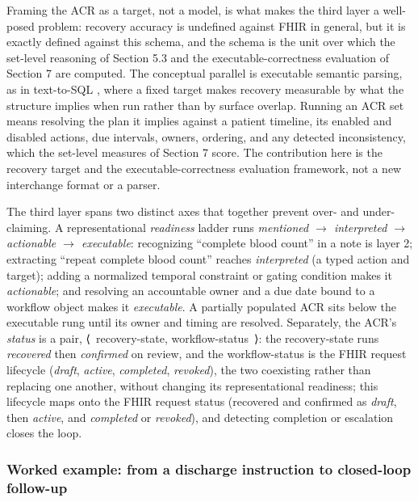 \documentclass[3p,twocolumn]{elsarticle}
\begin{document}
Framing the ACR as a target, not a model, is what makes the third layer a well-posed problem: recovery accuracy is undefined against FHIR in general, but it is exactly defined against this schema, and the schema is the unit over which the set-level reasoning of Section 5.3 and the executable-correctness evaluation of Section 7 are computed. The conceptual parallel is executable semantic parsing, as in text-to-SQL \cite{ref31}, where a fixed target makes recovery measurable by what the structure implies when run rather than by surface overlap. Running an ACR set means resolving the plan it implies against a patient timeline, its enabled and disabled actions, due intervals, owners, ordering, and any detected inconsistency, which the set-level measures of Section 7 score. The contribution here is the recovery target and the executable-correctness evaluation framework, not a new interchange format or a parser.

The third layer spans two distinct axes that together prevent over- and under-claiming. A representational \emph{readiness} ladder runs \emph{mentioned $\rightarrow$ interpreted $\rightarrow$ actionable $\rightarrow$ executable}: recognizing ``complete blood count'' in a note is layer 2; extracting ``repeat complete blood count'' reaches \emph{interpreted} (a typed action and target); adding a normalized temporal constraint or gating condition makes it \emph{actionable}; and resolving an accountable owner and a due date bound to a workflow object makes it \emph{executable}. A partially populated ACR sits below the executable rung until its owner and timing are resolved. Separately, the ACR's \emph{status} is a pair, ⟨~recovery-state, workflow-status~⟩: the recovery-state runs \emph{recovered} then \emph{confirmed} on review, and the workflow-status is the FHIR request lifecycle (\emph{draft}, \emph{active}, \emph{completed}, \emph{revoked}), the two coexisting rather than replacing one another, without changing its representational readiness; this lifecycle maps onto the FHIR request status (recovered and confirmed as \emph{draft}, then \emph{active}, and \emph{completed} or \emph{revoked}), and detecting completion or escalation closes the loop.

\subsubsection*{Worked example: from a discharge instruction to closed-loop follow-up}\label{worked-example-from-a-discharge-instruction-to-closed-loop-follow-up}
\end{document}
